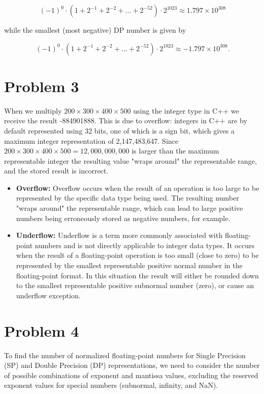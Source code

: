 \documentclass{article}
\begin{document}
$$(-1)^0 \cdot \left(1 + 2^{-1} + 2^{-2} + \dots + 2^{-52} \right)\cdot 2^{1023} \approx 1.797 \times 10^{308}$$

while the smallest (most negative) DP number is given by

$$(-1)^0 \cdot \left(1 + 2^{-1} + 2^{-2} + \dots + 2^{-52} \right)\cdot 2^{1023} \approx -1.797 \times 10^{308}.$$

\section*{Problem 3}

When we multiply $200 \times 300 \times 400 \times 500$ using the integer type in C++ we receive the result -884901888. This is due to overflow: integers in C++ are by default represented using 32 bits, one of which is a sign bit, which gives a maximum integer representation of 2,147,483,647. Since $200 \times 300 \times 400 \times 500=12,000,000,000$ is larger than the maximum representable integer the resulting value "wraps around" the representable range, and the stored result is incorrect. 

\begin{itemize}
    \item \textbf{Overflow:} Overflow occurs when the result of an operation is too large to be represented by the specific data type being used. The resulting number "wraps around" the representable range, which can lead to large positive numbers being erroneously stored as negative numbers, for example. 
    \item \textbf{Underflow:} Underflow is a term more commonly associated with floating-point numbers and is not directly applicable to integer data types. It occurs when the result of a floating-point operation is too small (close to zero) to be represented by the smallest representable positive normal number in the floating-point format. In this situation the result will either be rounded down to the smallest representable positive subnormal number (zero), or cause an underflow exception.
\end{itemize}

\section*{Problem 4}
To find the number of normalized floating-point numbers for Single Precision (SP) and Double Precision (DP) representations, we need to consider the number of possible combinations of exponent and mantissa values, excluding the reserved exponent values for special numbers (subnormal, infinity, and NaN).
\end{document}
